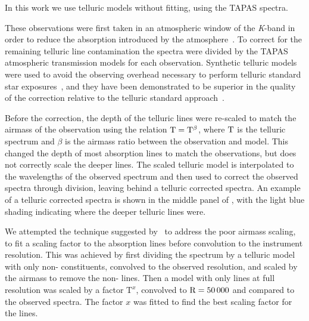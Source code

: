 In this work we use telluric models without fitting, using the {TAPAS} spectra.

These observations were first taken in an atmospheric window of the \emph{K}-band in order to reduce the absorption introduced by the atmosphere~\citep{barnes_hd_2008}.
 To correct for the remaining telluric line contamination the spectra were divided by the {TAPAS}\citep{bertaux_tapas_2014} atmospheric transmission models for each observation. Synthetic telluric models were used to avoid the observing overhead necessary to perform telluric standard star exposures~\citep{vacca_method_2003}, and they have been demonstrated to be superior in the quality of the correction relative to the telluric standard approach~\citep[e.g.][]{cotton_atmospheric_2014}.

Before the correction, the depth of the telluric lines were re-scaled to match the airmass of the observation using the relation \(\rm T = T^{\beta}\), where \(\rm T\) is the telluric spectrum and \(\beta\) is the airmass ratio between the observation and model. This changed the depth of most absorption lines to match the observations, but does not correctly scale the deeper  lines. The scaled telluric model is interpolated to the wavelengths of the observed spectrum and then used to correct the observed spectra through division, leaving behind a telluric corrected spectra. An example of a telluric corrected spectra is shown in the middle panel of , with the light blue shading indicating where the deeper telluric lines were.

We attempted the technique suggested by~\citet{bertaux_tapas_2014} to address the poor  airmass scaling, to fit a scaling factor to the   absorption lines before convolution to the instrument resolution. This was achieved by first dividing the spectrum by a telluric model with only non- constituents, convolved to the observed resolution, and scaled by the airmass to remove the non- lines. Then a model with only  lines at full resolution was scaled by a factor \(\textrm{T}^{x}\), convolved to \(\rm R=50\,000\) and compared to the observed spectra. The factor \(x\) was fitted to find the best scaling factor for the  lines.

